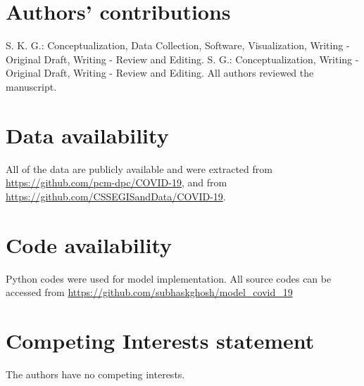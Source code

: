 \documentclass[fleqn,10pt]{wlscirep}
\begin{document}
\section*{Authors' contributions}
S. K. G.: Conceptualization, Data Collection, Software, Visualization, Writing - Original Draft, Writing - Review and Editing. S. G.: Conceptualization, Writing - Original Draft, Writing - Review and Editing. All authors reviewed the manuscript.

\section*{Data availability}
All of the data are publicly available and were extracted from \url{https://github.com/pcm-dpc/COVID-19}, and from \url{https://github.com/CSSEGISandData/COVID-19}.

\section*{Code availability}
Python codes were used for model implementation. All source codes can be accessed from \url{https://github.com/subhaskghosh/model_covid_19}

\section*{Competing Interests statement}
The authors have no competing interests.

	
\end{document}
